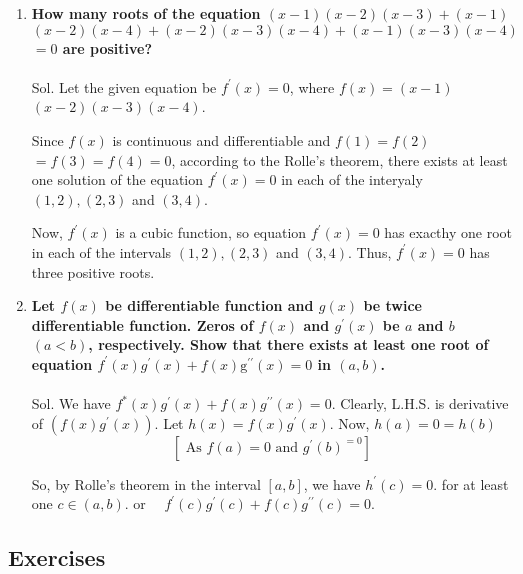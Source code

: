 \begin{enumerate}
    \item \textbf{How many roots of the equation $(x-1)(x-2)(x-3)+(x-1)$ $(x-2)(x-4)+(x-2)(x-3)(x-4)+(x-1)(x-3)(x-4)$ $=0$ are positive?}\\\\
Sol. Let the given equation be $f^{\prime}(x)=0$, where $f(x)=(x-1)$ $(x-2)(x-3)(x-4)$.

Since $f(x)$ is continuous and differentiable and $f(1)=f(2)$ $=f(3)=f(4)=0$, according to the Rolle's theorem, there exists at least one solution of the equation $f^{\prime}(x)=0$ in each of the interyaly $(1,2),(2,3)$ and $(3,4)$.

Now, $f^{\prime}(x)$ is a cubic function, so equation $f^{\prime}(x)=0$ has exacthy one root in each of the intervals $(1,2),(2,3)$ and $(3,4)$.
Thus, $f^{\prime}(x)=0$ has three positive roots.


\item \textbf{Let $f(x)$ be differentiable function and $g(x)$ be twice differentiable function. Zeros of $f(x)$ and $g^{\prime}(x)$ be $a$ and $b$ $(a<b)$, respectively. Show that there exists at least one root of equation $f^{\prime}(x) g^{\prime}(x)+f(x) \mathrm{g}^{\prime \prime}(x)=0$ in $(a, b)$.}\\\\

Sol. We have $f^*(x) g^{\prime}(x)+f(x) g^{\prime \prime}(x)=0$.
Clearly, L.H.S. is derivative of $\left(f(x) g^{\prime}(x)\right)$.
Let $h(x)=f(x) g^{\prime}(x)$.
Now, $h(a)=0=h(b)$
$$
\left[\text { As } f(a)=0 \text { and } g^{\prime}(b)^{=0} \right ]
$$

So, by Rolle's theorem in the interval $[a, b]$, we have $h^{\prime}(c)=0$. for at least one $c \in(a, b)$.
or $\quad f^{\prime}(c) g^{\prime}(c)+f(c) g^{\prime \prime}(c)=0$.

\end{enumerate}


\subsection{Exercises}


